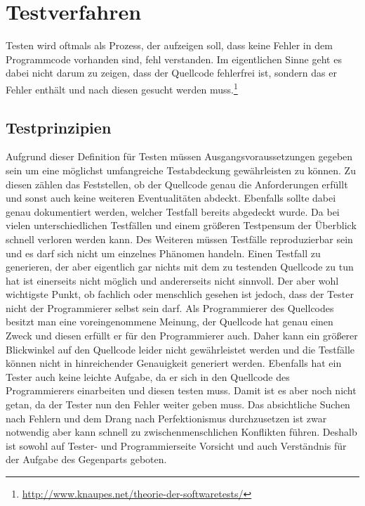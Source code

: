 \section{Testverfahren}
Testen wird oftmals als Prozess, der aufzeigen soll, dass keine Fehler in dem Programmcode vorhanden sind, fehl verstanden. Im eigentlichen Sinne geht es dabei nicht darum zu zeigen, dass der Quellcode fehlerfrei ist, sondern das er Fehler enthält und nach diesen gesucht werden muss.\footnote{\url{http://www.knaupes.net/theorie-der-softwaretests/}}

\subsection{Testprinzipien}
Aufgrund dieser Definition für Testen müssen Ausgangsvoraussetzungen gegeben sein um eine möglichst umfangreiche Testabdeckung gewährleisten zu können. Zu diesen zählen das Feststellen, ob der Quellcode genau die Anforderungen erfüllt und sonst auch keine weiteren Eventualitäten abdeckt. 
Ebenfalls sollte dabei genau dokumentiert werden, welcher Testfall bereits abgedeckt wurde. 
Da bei vielen unterschiedlichen Testfällen und einem größeren Testpensum der Überblick schnell verloren werden kann.
Des Weiteren müssen Testfälle reproduzierbar sein und es darf sich nicht um einzelnes Phänomen handeln. 
Einen Testfall zu generieren, der aber eigentlich gar nichts mit dem zu testenden Quellcode zu tun hat ist einerseits nicht möglich und andererseits nicht sinnvoll. 
Der aber wohl wichtigste Punkt, ob fachlich oder menschlich gesehen ist jedoch, dass der Tester nicht der Programmierer selbst sein darf.
Als Programmierer des Quellcodes besitzt man eine voreingenommene Meinung, der Quellcode hat genau einen Zweck und diesen erfüllt er für den Programmierer auch. 
Daher kann ein größerer Blickwinkel auf den Quellcode leider nicht gewährleistet werden und die Testfälle können nicht in hinreichender Genauigkeit generiert werden. 
Ebenfalls hat ein Tester auch keine leichte Aufgabe, da er sich in den Quellcode des Programmierers einarbeiten und diesen testen muss. 
Damit ist es aber noch nicht getan, da der Tester nun den Fehler weiter geben muss.
Das absichtliche Suchen nach Fehlern und dem Drang nach Perfektionismus durchzusetzen ist zwar notwendig aber kann schnell zu zwischenmenschlichen Konflikten führen. 
Deshalb ist sowohl auf Tester- und Programmierseite Vorsicht und auch Verständnis für der Aufgabe des Gegenparts geboten.